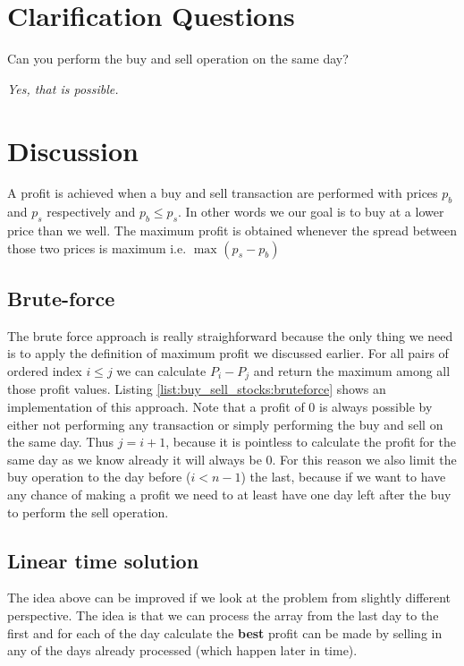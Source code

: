 \section{Clarification Questions}

\begin{QandA}
	\item Can you perform the buy and sell operation on the same day?
	\begin{answered}
		\textit{Yes, that is possible.}
	\end{answered}
\end{QandA}

\section{Discussion}
\label{buy_sell_stocks:sec:discussion}
A profit is achieved when a buy and sell transaction are performed with prices $p_b$ and $p_s$ respectively and $p_b \leq p_s$. In other words we our goal is to buy at a lower price than we well. The maximum profit is obtained whenever the spread between those two prices is maximum i.e. $\max_{}{(p_s - p_b)}$

\subsection{Brute-force}
\label{buy_sell_stocks:sec:bruteforce}
The brute force approach is really straighforward because the only thing we need is to apply the definition of maximum profit we discussed earlier. For all pairs of ordered index $i \leq j$ we can calculate $P_i - P_j$ and return the maximum among all those profit values. Listing \ref{list:buy_sell_stocks:bruteforce} shows an implementation of this approach. Note that a profit of $0$ is always possible by either not performing any transaction or simply performing the buy and sell on the same day. Thus $j = i+1$, because it is pointless to calculate the profit for the same day as we know already it will always be $0$. For this reason we also limit the buy operation to the day before ($i< n-1$) the last, because if we want to have any chance of making a profit we need to at least have one day left after the buy to perform the sell operation. 



\subsection{Linear time solution}
\label{buy_sell_stocks:sec:linear}
The idea above can be improved if we look at the problem from slightly different perspective. The idea is that we can process the array from the last day to the first and for each of the day calculate the \textbf{best} profit can be made by selling in any of the days already processed (which happen later in time).

